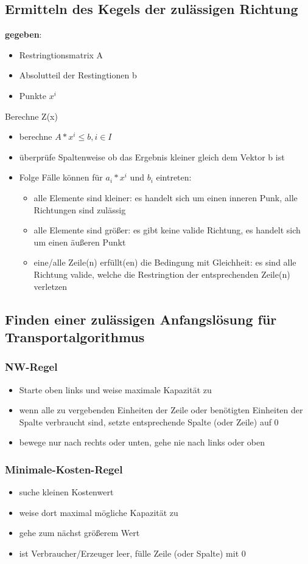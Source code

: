 \documentclass[12pt,a4paper, hyperref]{article}
\begin{document}
\subsection{Ermitteln des Kegels der zulässigen Richtung}
\textbf{gegeben}:
\begin{itemize}
\item Restringtionsmatrix A
\item Absolutteil der Restingtionen b
\item Punkte $x^i$
\end{itemize}
Berechne Z(x)
\begin{itemize}
\item berechne $A*x^i \leq b, i \in I$
\item überprüfe Spaltenweise ob das Ergebnis kleiner gleich dem Vektor b ist
\item Folge Fälle können für $a_i * x^i$ und $b_i$ eintreten:
\begin{itemize}
\item alle Elemente sind kleiner: es handelt sich um einen inneren Punk, alle Richtungen sind zulässig
\item alle Elemente sind größer: es gibt keine valide Richtung, es handelt sich um einen äußeren Punkt
\item eine/alle Zeile(n) erfüllt(en) die Bedingung mit Gleichheit: es sind alle Richtung valide, welche die Restringtion der entsprechenden Zeile(n) verletzen
\end{itemize}
\end{itemize}

\subsection{Finden einer zulässigen Anfangslösung für Transportalgorithmus}
\subsubsection{NW-Regel}
\begin{itemize}
\item Starte oben links und weise maximale Kapazität zu
\item wenn alle zu vergebenden Einheiten der Zeile oder benötigten Einheiten der Spalte verbraucht sind, setzte entsprechende Spalte (oder Zeile) auf 0
\item bewege nur nach rechts oder unten, gehe nie nach links oder oben
\end{itemize}
\subsubsection{Minimale-Kosten-Regel}
\begin{itemize}
\item suche kleinen Kostenwert
\item weise dort maximal mögliche Kapazität zu
\item gehe zum nächst größerem Wert
\item ist Verbraucher/Erzeuger leer, fülle Zeile (oder Spalte) mit 0
\end{itemize}
\end{document}
